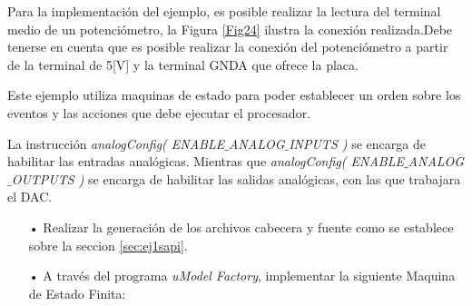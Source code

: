 \documentclass[12pt,letterpaper]{article}
\begin{document}
Para la implementación del ejemplo, es posible realizar la lectura del terminal medio de un potenciómetro, la Figura \ref{Fig24} ilustra la conexión realizada.Debe tenerse en cuenta que es posible realizar la conexión del potenciómetro a partir de la terminal de 5[V] y la terminal GNDA que ofrece la placa.

Este ejemplo utiliza maquinas de estado para poder establecer un orden sobre los eventos y las acciones que debe ejecutar el procesador.

La instrucción \textit{analogConfig( ENABLE$\_$ANALOG$\_$INPUTS )} se encarga de habilitar las entradas analógicas. Mientras que \textit{analogConfig( ENABLE$\_$ANALOG$\_$OUTPUTS )} se encarga de habilitar las salidas analógicas, con las que trabajara el DAC.

\begin{enumerate}
\item[•]Realizar la generación de los archivos cabecera y fuente como se establece sobre la seccion \ref{sec:ej1sapi}.

\item[•] A través del programa \textit{uModel Factory}, implementar la siguiente Maquina de Estado Finita:


\end{enumerate}
\end{document}
